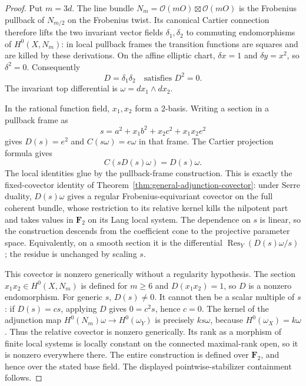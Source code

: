 \begin{proof}
Put $m=3d$. The line bundle
$N_m=\mathcal O(mO)\boxtimes\mathcal O(mO)$ is the Frobenius pullback
of $N_{m/2}$ on the Frobenius twist. Its canonical Cartier connection
therefore lifts the two invariant vector fields $\delta_1,\delta_2$
to commuting endomorphisms of $H^0(X,N_m)$: in local pullback frames
the transition functions are squares and are killed by these derivations.
On the affine elliptic chart, $\delta x=1$ and $\delta y=x^2$,
so $\delta^2=0$. Consequently
\[
          D=\delta_1\delta_2\quad\text{satisfies }D^2=0.
\]
The invariant top differential is $\omega=dx_1\wedge dx_2$.

In the rational function field, $x_1,x_2$ form a $2$-basis.
Writing a section in a pullback frame as
\[
 s=a^2+x_1b^2+x_2c^2+x_1x_2e^2
\]
gives $D(s)=e^2$ and $C(s\omega)=e\omega$ in that frame.
The Cartier projection formula gives
\begin{equation}\label{eq:ss-even-fixed-Cartier}
              C(sD(s)\omega)=D(s)\omega.
\end{equation}
The local identities glue by the pullback-frame construction.
This is exactly the fixed-covector identity of
Theorem~\ref{thm:general-adjunction-covector}: under Serre duality,
$D(s)\omega$ gives a regular Frobenius-equivariant covector on the
full coherent bundle, whose restriction to its relative kernel kills
the nilpotent part and takes values in $\mathbf F_2$ on its Lang
local system. The dependence on $s$ is linear, so the construction
descends from the coefficient cone to the projective parameter space.
Equivalently, on a smooth section it is the differential
$\operatorname{Res}_Y(D(s)\omega/s)$; the residue is unchanged by
scaling $s$.

This covector is nonzero generically without a regularity hypothesis.
The section $x_1x_2\in H^0(X,N_m)$ is defined for $m\ge6$ and
$D(x_1x_2)=1$, so $D$ is a nonzero endomorphism. For generic $s$,
$D(s)\ne0$. It cannot then be a scalar multiple of $s$: if
$D(s)=c s$, applying $D$ gives $0=c^2s$, hence $c=0$.
The kernel of the adjunction map $H^0(N_m)\omega\to H^0(\omega_Y)$
is precisely $k s\omega$, because $H^0(\omega_X)=k\omega$.
Thus the relative covector is nonzero generically. Its rank as a
morphism of finite local systems is locally constant on the connected
maximal-rank open, so it is nonzero everywhere there. The entire
construction is defined over $\mathbf F_2$, and hence over the stated
base field. The displayed pointwise-stabilizer containment follows.
\end{proof}
